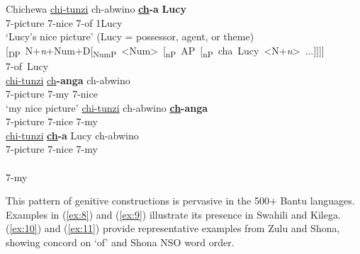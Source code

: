 \documentclass[output=paper
,modfonts
,nonflat]{langsci/langscibook}
\begin{document}
\begin{exe}
		\ex  Chichewa \citep[372, 374]{Carstens1997} \label{ex:7}
		\xlist
		\ex \label{ex:7a}
		\gll \underline{chi}\underline{-tunzi}     ch-abwino     \textbf{\underline{ch}-a}   \textbf{Lucy}\\
		7-picture   7-nice         7-of   1Lucy\\
		\glt `Lucy's nice picture'  (Lucy = possessor, agent, or theme) 	
		\ex \label{ex:7b}
		\gll \mbox{[\textsubscript{DP} N+\textit{n}+Num+D[\textsubscript{NumP} <Num> [\textsubscript{nP} AP [\textsubscript{nP} cha Lucy <N+\textit{n}> ...]]]]}\\
		\mbox{\hspace{6.7cm}7-of Lucy}\\ 
		\ex \label{ex:7c}{}
		\gll \underline{chi}\underline{-tunzi}      \underline{ch}\textbf{-anga}     ch-abwino\\
		7-picture   7-my         7-nice\\
		\glt `my nice picture'
		\ex \label{ex:7d}
		\gll  *\underline{chi}\underline{-tunzi}    ch-abwino     \textbf{\underline{ch}-anga}\\
		7-picture   7-nice      7-my\\
		\ex \label{ex:7e}
		\gll  *\underline{chi}\underline{-tunzi}    \textbf{\underline{ch}-a} Lucy     ch-abwino\\
		7-picture   7-nice      7-my\\
		\ex \label{ex:7f}
		\gll {}\\
		\mbox{\hspace{3.5cm}7-my}  \\
		\endxlist
\end{exe}
This pattern of genitive constructions is pervasive in the 500+ Bantu languages. Examples in (\ref{ex:8}) and (\ref{ex:9}) illustrate its presence in Swahili and Kilega. (\ref{ex:10}) and (\ref{ex:11}) provide representative examples from Zulu and Shona, showing concord on ‘of’ and Shona NSO word order.
\end{document}
